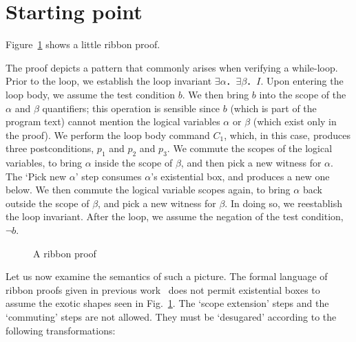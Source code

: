 \documentclass[svgnames]{llncs}
\begin{document}
\section{Starting point}\label{sect:starting_point}

\def\comheight{5}
\def\comtextheight{\comheight/2}
\def\comtextleft{2}
\def\ribtextheight{3}

\newcommand{\mkRibbon}[5]{\fill[black!10] (#1,#2) rectangle (#3,#4);
\node at (#1/2+#3/2,#2+\ribtextheight) {#5}}
\newcommand{\mkStep}[4]{\fill[black!50] (#1,#2) rectangle (#3,#2+\comheight);
\node[anchor=west,text=white] at (#1+\comtextleft,#2+\comtextheight) {#4}}


Figure~\ref{fig:ribbonproof1} shows a little ribbon proof.

The proof depicts a pattern that commonly arises when verifying a while-loop. Prior to the loop, we establish the loop invariant $∃α．∃β．I$. Upon entering the loop body, we assume the test condition $b$. We then bring $b$ into the scope of the $α$ and $β$ quantifiers; this operation is sensible since $b$ (which is part of the program text) cannot mention the logical variables $α$ or $β$ (which exist only in the proof). We perform the loop body command $C_1$, which, in this case, produces three postconditions, $p_1$ and $p_2$ and $p_3$. We commute the scopes of the logical variables, to bring $α$ inside the scope of $β$, and then pick a new witness for $α$. The `Pick new $α$' step consumes $α$'s existential box, and produces a new one below. We then commute the logical variable scopes again, to bring $α$ back outside the scope of $β$, and pick a new witness for $β$. In doing so, we reestablish the loop invariant. After the loop, we assume the negation of the test condition, $¬b$.

\begin{figure}
\begin{center}

\end{center}
\caption{A ribbon proof}
\label{fig:ribbonproof1}
\end{figure}

\clearpage

Let us now examine the semantics of such a picture. The formal language of ribbon proofs given in previous work~\cite{wickerson+13} does not permit existential boxes to assume the exotic shapes seen in Fig.~\ref{fig:ribbonproof1}. The `scope extension' steps and the `commuting' steps are not allowed. They must be `desugared' according to the following transformations:
\end{document}
